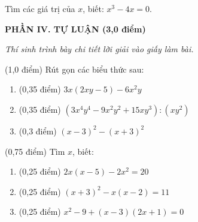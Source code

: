 \documentclass[12pt,a4paper]{article}
\begin{document}
\begin{ex}
Tìm các giá trị của $x$, biết: $x^3 - 4x = 0$. 
\end{ex}


\setcounter{ex}{0}
\noindent\textbf{\large PHẦN IV. TỰ LUẬN (3,0 điểm)}

\textit{Thí sinh trình bày chi tiết lời giải vào giấy làm bài.}

\vspace{1mm}
\begin{ex} (1,0 điểm)
Rút gọn các biểu thức sau:
\begin{enumerate}[label=\textbf{\alph*)}, leftmargin=0.8cm, itemsep=2pt]
\item (0,35 điểm) $3x(2xy - 5) - 6x^2y$
\item (0,35 điểm) $(3x^4y^4 - 9x^2y^2 + 15xy^3) : (xy^2)$
\item (0,3 điểm) $(x - 3)^2 - (x + 3)^2$
\end{enumerate}
\end{ex}
\vspace{0.5mm}

\begin{ex} (0,75 điểm)
Tìm $x$, biết:
\begin{enumerate}[label=\textbf{\alph*)}, leftmargin=0.8cm, itemsep=2pt]
\item (0,25 điểm) $2x(x - 5) - 2x^2 = 20$
\item (0,25 điểm) $(x + 3)^2 - x(x - 2) = 11$
\item (0,25 điểm) $x^2 - 9 + (x - 3)(2x + 1) = 0$
\end{enumerate}
\end{ex}
\vspace{0.5mm}
\end{document}
